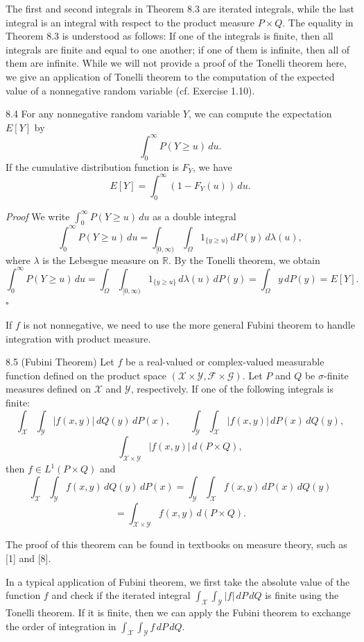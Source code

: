 The first and second integrals in Theorem 8.3 are iterated integrals, while the last integral is an integral with respect to the product measure $P\times Q$. The equality in Theorem 8.3 is understood as follows: If one of the integrals is finite, then all integrals are finite and equal to one another; if one of them is infinite, then all of them are infinite. While we will not provide a proof of the Tonelli theorem here, we give an application of Tonelli theorem to the computation of the expected value of a nonnegative random variable (cf. Exercise 1.10).

\begin{thmbox}{8.4}
For any nonnegative random variable $Y$, we can compute the expectation $E[Y]$ by
\[
\int_0^{\infty} P(Y\ge u)\, du.
\]
If the cumulative distribution function is $F_Y$, we have
\[
E[Y]=\int_0^{\infty} (1-F_Y(u))\, du.
\]
\end{thmbox}

\textit{Proof} We write $\int_0^{\infty} P(Y\ge u)\, du$ as a double integral
\[
\int_0^{\infty} P(Y\ge u)\, du
=
\int_{[0,\infty)} \int_{\Omega} 1_{\{y\ge u\}}\, dP(y)\, d\lambda(u),
\]
where $\lambda$ is the Lebesgue measure on $\mathbb{R}$. By the Tonelli theorem, we obtain
\[
\int_0^{\infty} P(Y\ge u)\, du
=
\int_{\Omega}\int_{[0,\infty)} 1_{\{y\ge u\}}\, d\lambda(u)\, dP(y)
=
\int_{\Omega} y\, dP(y)
=
E[Y].
\]
\hfill $\square$

If $f$ is not nonnegative, we need to use the more general Fubini theorem to handle integration with product measure.

\begin{thmbox}{8.5 (Fubini Theorem)}
Let $f$ be a real-valued or complex-valued measurable function defined on the product space $(\mathcal{X}\times \mathcal{Y},\mathcal{F}\times \mathcal{G})$. Let $P$ and $Q$ be $\sigma$-finite measures defined on $\mathcal{X}$ and $\mathcal{Y}$, respectively. If one of the following integrals is finite:
\[
\int_{\mathcal{X}} \int_{\mathcal{Y}} |f(x,y)|\, dQ(y)\, dP(x), \qquad
\int_{\mathcal{Y}} \int_{\mathcal{X}} |f(x,y)|\, dP(x)\, dQ(y),
\]
\[
\int_{\mathcal{X}\times \mathcal{Y}} |f(x,y)|\, d(P\times Q),
\]
then $f\in L^1(P\times Q)$ and
\[
\int_{\mathcal{X}} \int_{\mathcal{Y}} f(x,y)\, dQ(y)\, dP(x)
=
\int_{\mathcal{Y}} \int_{\mathcal{X}} f(x,y)\, dP(x)\, dQ(y)
\]
\[
=
\int_{\mathcal{X}\times \mathcal{Y}} f(x,y)\, d(P\times Q).
\]
\end{thmbox}

The proof of this theorem can be found in textbooks on measure theory, such as [1] and [8].

In a typical application of Fubini theorem, we first take the absolute value of the function $f$ and check if the iterated integral $\int_{\mathcal{X}}\int_{\mathcal{Y}} |f|\, dP\, dQ$ is finite using the Tonelli theorem. If it is finite, then we can apply the Fubini theorem to exchange the order of integration in $\int_{\mathcal{X}}\int_{\mathcal{Y}} f\, dP\, dQ$.
